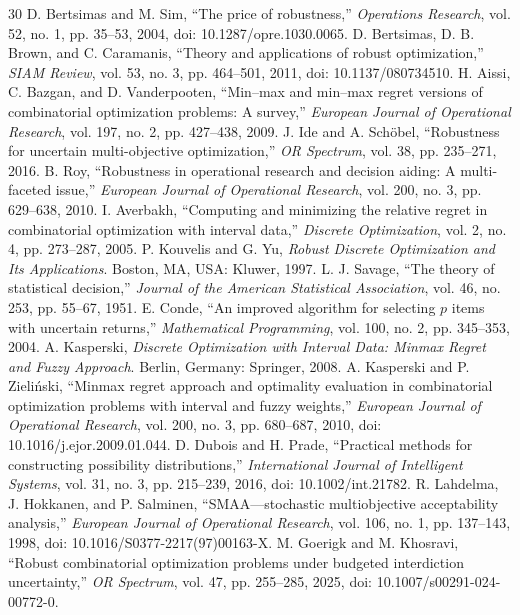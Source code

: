 \documentclass[conference]{IEEEtran}
\begin{document}
\begin{thebibliography}{30}
 D. Bertsimas and M. Sim, ``The price of robustness,'' \emph{Operations Research}, vol. 52, no. 1, pp. 35--53, 2004, doi: 10.1287/opre.1030.0065.
 D. Bertsimas, D. B. Brown, and C. Caramanis, ``Theory and applications of robust optimization,'' \emph{SIAM Review}, vol. 53, no. 3, pp. 464--501, 2011, doi: 10.1137/080734510.
 H. Aissi, C. Bazgan, and D. Vanderpooten, ``Min--max and min--max regret versions of combinatorial optimization problems: A survey,'' \emph{European Journal of Operational Research}, vol. 197, no. 2, pp. 427--438, 2009.
 J. Ide and A. Sch\"obel, ``Robustness for uncertain multi-objective optimization,'' \emph{OR Spectrum}, vol. 38, pp. 235--271, 2016.
 B. Roy, ``Robustness in operational research and decision aiding: A multi-faceted issue,'' \emph{European Journal of Operational Research}, vol. 200, no. 3, pp. 629--638, 2010.
 I. Averbakh, ``Computing and minimizing the relative regret in combinatorial optimization with interval data,'' \emph{Discrete Optimization}, vol. 2, no. 4, pp. 273--287, 2005.
 P. Kouvelis and G. Yu, \emph{Robust Discrete Optimization and Its Applications}. Boston, MA, USA: Kluwer, 1997.
 L. J. Savage, ``The theory of statistical decision,'' \emph{Journal of the American Statistical Association}, vol. 46, no. 253, pp. 55--67, 1951.
 E. Conde, ``An improved algorithm for selecting $p$ items with uncertain returns,'' \emph{Mathematical Programming}, vol. 100, no. 2, pp. 345--353, 2004.
 A. Kasperski, \emph{Discrete Optimization with Interval Data: Minmax Regret and Fuzzy Approach}. Berlin, Germany: Springer, 2008.
 A. Kasperski and P. Zieli\'nski, ``Minmax regret approach and optimality evaluation in combinatorial optimization problems with interval and fuzzy weights,'' \emph{European Journal of Operational Research}, vol. 200, no. 3, pp. 680--687, 2010, doi: 10.1016/j.ejor.2009.01.044.
 D. Dubois and H. Prade, ``Practical methods for constructing possibility distributions,'' \emph{International Journal of Intelligent Systems}, vol. 31, no. 3, pp. 215--239, 2016, doi: 10.1002/int.21782.
 R. Lahdelma, J. Hokkanen, and P. Salminen, ``SMAA---stochastic multiobjective acceptability analysis,'' \emph{European Journal of Operational Research}, vol. 106, no. 1, pp. 137--143, 1998, doi: 10.1016/S0377-2217(97)00163-X.
 M. Goerigk and M. Khosravi, ``Robust combinatorial optimization problems under budgeted interdiction uncertainty,'' \emph{OR Spectrum}, vol. 47, pp. 255--285, 2025, doi: 10.1007/s00291-024-00772-0.
\end{thebibliography}
\end{document}
